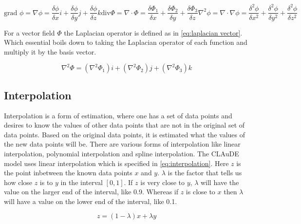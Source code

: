 \begin{subequations}
    \begin{equation}
        \text{grad } \phi = \nabla \phi = \frac{\delta \phi}{\delta x}i + \frac{\delta \phi}{\delta y}j + \frac{\delta \phi}{\delta z}k
        \label{eq:gradient}
    \end{equation}
    \begin{equation}
        \text{div} \Phi = \nabla \cdot \Phi = \frac{\delta \Phi_1}{\delta x} + \frac{\delta \Phi_2}{\delta y} + \frac{\delta \Phi_3}{\delta z}
        \label{eq:divergence}
    \end{equation}
    \begin{equation}
        \nabla^2 \phi = \nabla \cdot \nabla \phi = \frac{\delta^2 \phi}{\delta x^2} + \frac{\delta^2 \phi}{\delta y^2} + \frac{\delta^2 \phi}{\delta z^2}
        \label{eq:laplacian scalar}
    \end{equation}
\end{subequations}

For a vector field $\Phi$ the Laplacian operator is defined as in \autoref{eq:laplacian vector}. Which essential boils down to taking the Laplacian operator of each function and multiply it by
the basis vector.

\begin{equation}
    \nabla^2 \Phi = (\nabla^2 \Phi_1)i + (\nabla^2 \Phi_2)j + (\nabla^2 \Phi_3)k
    \label{eq:laplacian vector}
\end{equation}

\subsection{Interpolation} \label{sec:interpolation}
Interpolation is a form of estimation, where one has a set of data points and desires to know the values of other data points that are not in the original set of data points\cite{interpolation}. 
Based on the original data points, it is estimated what the values of the new data points will be. There are various forms of interpolation like linear interpolation, polynomial interpolation 
and spline interpolation. The CLAuDE model uses linear interpolation which is specified in \autoref{eq:interpolation}. Here $z$ is the point inbetween the known data points $x$ and $y$. 
$\lambda$ is the factor that tells us how close $z$ is to $y$ in the interval $[0, 1]$. If $z$ is very close to $y$, $\lambda$ will have the value on the larger end of the interval, like 0.9.
Whereas if $z$ is close to $x$ then $\lambda$ will have a value on the lower end of the interval, like 0.1.

\begin{equation}
    z = (1 - \lambda)x + \lambda y
    \label{eq:interpolation}
\end{equation}